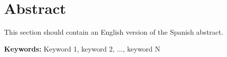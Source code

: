 \chapter*{Abstract}
This section should contain an English version of the Spanish abstract.

\vspace{.5cm}

\textbf{Keywords:} Keyword 1, keyword 2, ..., keyword N
